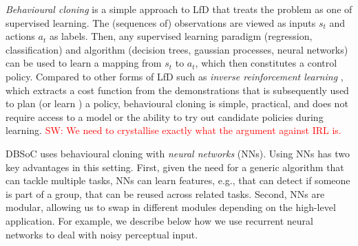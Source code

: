 \documentclass[letterpaper, 10 pt, conference]{ieeeconf}
\newcommand{\sw}[1]{\textcolor{red}{SW: #1}}
\begin{document}
\emph{Behavioural cloning} is a simple approach to LfD that treats the problem as one of supervised learning. The (sequences of) observations are viewed as inputs $s_t$ and actions $a_t$ as labels.  Then, any supervised learning paradigm (regression, classification) and algorithm (decision trees, gaussian processes, neural networks) \cite{bishop2006pattern} can be used to learn a mapping from $s_t$ to $a_t$, which then constitutes a control policy.  Compared to other forms of LfD such as \emph{inverse reinforcement learning} \cite{abbeel2004apprenticeship}, which extracts a cost function from the demonstrations that is subsequently used to plan (or learn \cite{boularias2011relative}) a policy, behavioural cloning is simple, practical, and does not require access to a model or the ability to try out candidate policies during learning. \sw{We need to crystallise exactly what the argument against IRL is.}

DBSoC uses behavioural cloning with \emph{neural networks} (NNs).  Using NNs has two key advantages in this setting.  First, given the need for a generic algorithm that can tackle multiple tasks, NNs can learn features, e.g., that can detect if someone is part of a group, that can be reused across related tasks.  Second, NNs are modular, allowing us to swap in different modules depending on the high-level application. For example, we describe below how we use
recurrent neural networks to deal with noisy perceptual input.


\end{document}
